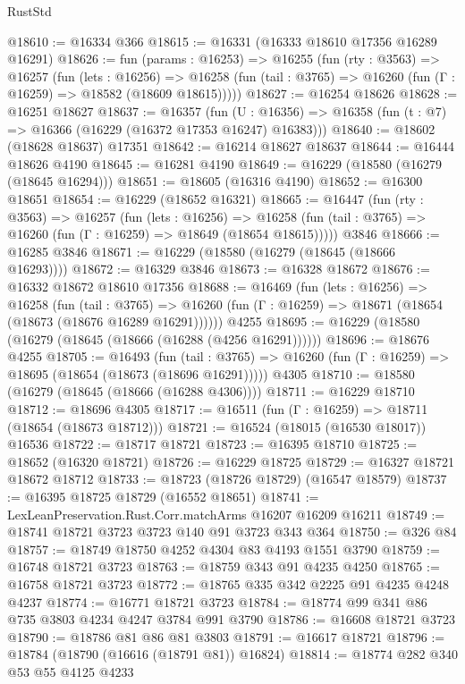 \begin{lexlean}{RustStd}
\begin{coremodule}
@18610 := @16334 @366
@18615 := @16331 (@16333 @18610 @17356 @16289 @16291)
@18626 := fun (params : @16253) =>
  @16255
    (fun (rty : @3563) =>
    @16257
      (fun (lets : @16256) =>
      @16258 (fun (tail : @3765) => @16260 (fun (Γ : @16259) => @18582 (@18609 @18615)))))
@18627 := @16254 @18626
@18628 := @16251 @18627
@18637 := @16357
    (fun (U : @16356) => @16358 (fun (t : @7) => @16366 (@16229 (@16372 @17353 @16247) @16383)))
@18640 := @18602 (@18628 @18637) @17351
@18642 := @16214 @18627 @18637
@18644 := @16444 @18626 @4190
@18645 := @16281 @4190
@18649 := @16229 (@18580 (@16279 (@18645 @16294)))
@18651 := @18605 (@16316 @4190)
@18652 := @16300 @18651
@18654 := @16229 (@18652 @16321)
@18665 := @16447
    (fun (rty : @3563) =>
    @16257
      (fun (lets : @16256) =>
      @16258 (fun (tail : @3765) => @16260 (fun (Γ : @16259) => @18649 (@18654 @18615)))))
    @3846
@18666 := @16285 @3846
@18671 := @16229 (@18580 (@16279 (@18645 (@18666 @16293))))
@18672 := @16329 @3846
@18673 := @16328 @18672
@18676 := @16332 @18672 @18610 @17356
@18688 := @16469
    (fun (lets : @16256) =>
    @16258
      (fun (tail : @3765) =>
      @16260 (fun (Γ : @16259) => @18671 (@18654 (@18673 (@18676 @16289 @16291))))))
    @4255
@18695 := @16229 (@18580 (@16279 (@18645 (@18666 (@16288 (@4256 @16291))))))
@18696 := @18676 @4255
@18705 := @16493
    (fun (tail : @3765) => @16260 (fun (Γ : @16259) => @18695 (@18654 (@18673 (@18696 @16291)))))
    @4305
@18710 := @18580 (@16279 (@18645 (@18666 (@16288 @4306))))
@18711 := @16229 @18710
@18712 := @18696 @4305
@18717 := @16511 (fun (Γ : @16259) => @18711 (@18654 (@18673 @18712)))
@18721 := @16524 (@18015 (@16530 @18017)) @16536
@18722 := @18717 @18721
@18723 := @16395 @18710
@18725 := @18652 (@16320 @18721)
@18726 := @16229 @18725
@18729 := @16327 @18721 @18672 @18712
@18733 := @18723 (@18726 @18729) (@16547 @18579)
@18737 := @16395 @18725 @18729 (@16552 @18651)
@18741 := LexLeanPreservation.Rust.Corr.matchArms @16207 @16209 @16211
@18749 := @18741 @18721 @3723 @3723 @140 @91 @3723 @343 @364
@18750 := @326 @84
@18757 := @18749 @18750 @4252 @4304 @83 @4193 @1551 @3790
@18759 := @16748 @18721 @3723
@18763 := @18759 @343 @91 @4235 @4250
@18765 := @16758 @18721 @3723
@18772 := @18765 @335 @342 @2225 @91 @4235 @4248 @4237
@18774 := @16771 @18721 @3723
@18784 := @18774 @99 @341 @86 @735 @3803 @4234 @4247 @3784 @991 @3790
@18786 := @16608 @18721 @3723
@18790 := @18786 @81 @86 @81 @3803
@18791 := @16617 @18721
@18796 := @18784 (@18790 (@16616 (@18791 @81)) @16824)
@18814 := @18774
    @282
    @340
    @53
    @55
    @4125
    @4233

\end{coremodule}
\end{lexlean}
